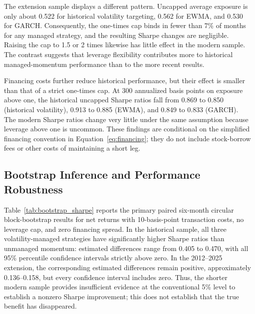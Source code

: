 \documentclass[11pt]{article}
\begin{document}
The extension sample displays a different pattern. Uncapped average exposure is only about 0.522 for historical volatility targeting, 0.562 for EWMA, and 0.530 for GARCH. Consequently, the one-times cap binds in fewer than 7\% of months for any managed strategy, and the resulting Sharpe changes are negligible. Raising the cap to 1.5 or 2 times likewise has little effect in the modern sample. The contrast suggests that leverage flexibility contributes more to historical managed-momentum performance than to the more recent results.

Financing costs further reduce historical performance, but their effect is smaller than that of a strict one-times cap. At 300 annualized basis points on exposure above one, the historical uncapped Sharpe ratios fall from 0.869 to 0.850 (historical volatility), 0.913 to 0.885 (EWMA), and 0.849 to 0.833 (GARCH). The modern Sharpe ratios change very little under the same assumption because leverage above one is uncommon. These findings are conditional on the simplified financing convention in Equation~\eqref{eq:financing}; they do not include stock-borrow fees or other costs of maintaining a short leg.

\subsection{Bootstrap Inference and Performance Robustness}
\label{sec:bootstrap_results}
Table~\ref{tab:bootstrap_sharpe} reports the primary paired six-month circular block-bootstrap results for net returns with 10-basis-point transaction costs, no leverage cap, and zero financing spread. In the historical sample, all three volatility-managed strategies have significantly higher Sharpe ratios than unmanaged momentum: estimated differences range from 0.405 to 0.470, with all 95\% percentile confidence intervals strictly above zero. In the 2012--2025 extension, the corresponding estimated differences remain positive, approximately 0.136--0.158, but every confidence interval includes zero. Thus, the shorter modern sample provides insufficient evidence at the conventional 5\% level to establish a nonzero Sharpe improvement; this does not establish that the true benefit has disappeared.
\end{document}
